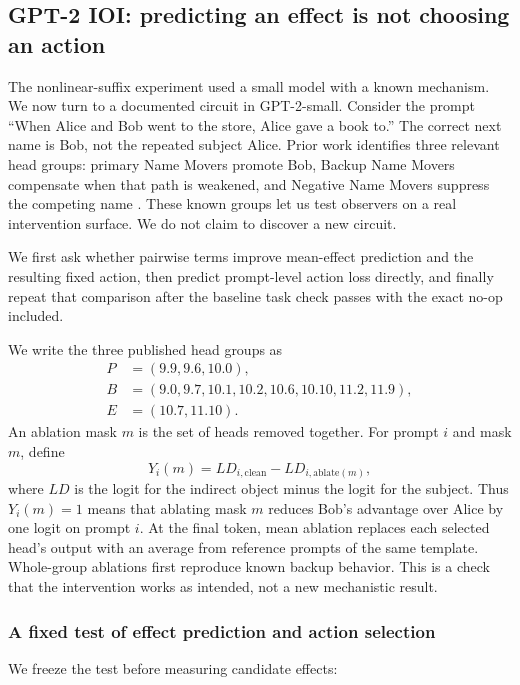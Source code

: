 \subsection{GPT-2 IOI: predicting an effect is not choosing an action}
\label{sec:ioi}

The nonlinear-suffix experiment used a small model with a known mechanism. We
now turn to a documented
circuit in GPT-2-small. Consider the prompt ``When Alice and Bob went to the
store, Alice gave a book to.'' The correct next name is Bob, not the repeated
subject Alice. Prior work identifies three relevant head groups: primary Name
Movers promote Bob, Backup Name Movers compensate when that path is weakened,
and Negative Name Movers suppress the competing name
\cite{wang2023ioi,mcgrath2023hydra,mcdougall2023copy,rushing2024selfrepair}.
These known groups let us test observers on a real intervention surface. We do
not claim to discover a new circuit.

We first ask whether pairwise terms improve mean-effect prediction and the
resulting fixed action, then predict prompt-level action loss directly, and
finally repeat that comparison after the baseline task check passes with the
exact no-op included.

We write the three published head groups as
\[
\begin{aligned}
P &= (9.9,9.6,10.0),\\
B &= (9.0,9.7,10.1,10.2,10.6,10.10,11.2,11.9),\\
E &= (10.7,11.10).
\end{aligned}
\]
An ablation mask $m$ is the set of heads removed together. For prompt $i$ and
mask $m$, define
\[
Y_i(m)=LD_{i,\mathrm{clean}}-LD_{i,\mathrm{ablate}(m)},
\]
where $LD$ is the logit for the indirect object minus the logit for the
subject. Thus $Y_i(m)=1$ means that ablating mask $m$ reduces Bob's advantage
over Alice by one logit on prompt $i$. At the final token, mean ablation
replaces each selected head's output with an average from reference prompts of
the same template. Whole-group ablations first reproduce known backup behavior.
This is a check that the intervention works as intended, not a new mechanistic
result.

\subsubsection{A fixed test of effect prediction and action selection}

We freeze the test before measuring candidate effects:

